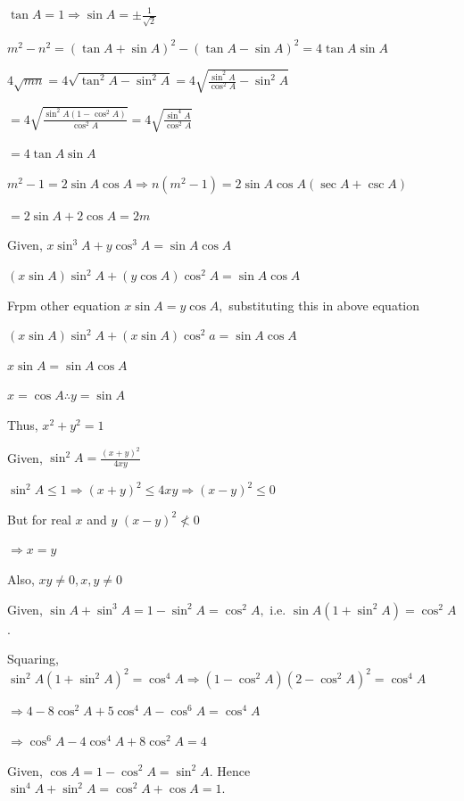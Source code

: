     $\tan A = 1\Rightarrow \sin A = \pm\frac{1}{\sqrt{2}}$

\item $m^2 - n^2 = (\tan A +\sin A)^2 - (\tan A - \sin A)^2 = 4\tan A\sin A$

    $4\sqrt{mn} = 4\sqrt{\tan^2A - \sin^2A} = 4\sqrt{\frac{\sin^2A}{\cos^2A} - \sin^2A}$

    $= 4\sqrt{\frac{\sin^2A(1 - \cos^2A)}{\cos^2A}} = 4\sqrt{\frac{\sin^4A}{\cos^2A}}$

    $= 4\tan A\sin A$

\item $m^2 - 1 = 2\sin A\cos A \Rightarrow n(m^2 - 1) = 2\sin A\cos A(\sec A + \csc A)$

    $= 2\sin A + 2\cos A = 2m$

\item Given, $x\sin^3 A + y\cos^3 A = \sin A\cos A$

    $(x\sin A)\sin^2A + (y\cos A)\cos^2A = \sin A\cos A$

    Frpm other equation $x\sin A = y\cos A,$ substituting this in above equation

    $(x\sin A)\sin^2A + (x\sin A)\cos^2a = \sin A\cos A$

    $x\sin A = \sin A\cos A$

    $x = \cos A \therefore y = \sin A$

    Thus, $x^2 + y^2 = 1$

\item Given, $\sin^2A = \frac{(x + y)^2}{4xy}$

    $\sin^2A \leq 1 \Rightarrow (x + y)^2 \leq 4xy \Rightarrow (x - y)^2 \leq 0$

    But for real $x$ and $y$ $(x - y)^2\nless 0$

    $\Rightarrow x = y$

    Also, $xy \neq 0, x, y\neq 0$
\stopitemize

\subject{Challenging Problems}
\startitemize[n, 1*broad]
\item Given, $\sin A + \sin^3 A = 1 - \sin^2 A = \cos^2 A,$ i.e. $\sin A(1 + \sin^2 A) = \cos^2 A$.

    Squaring, $\sin^2 A(1 + \sin^2 A)^2 = \cos^4 A \Rightarrow (1 - \cos^2 A)(2 - \cos^2 A)^2 = \cos^4 A$

    $\Rightarrow 4 - 8\cos^2 A + 5\cos^4 A - \cos^6 A = \cos^4 A$

    $\Rightarrow \cos^6 A - 4\cos^4 A + 8\cos^2 A = 4$

\item Given, $\cos A = 1 - \cos^2 A = \sin^2 A$. Hence $\sin^4 A + \sin^2 A = \cos^2 A + \cos A = 1$.

